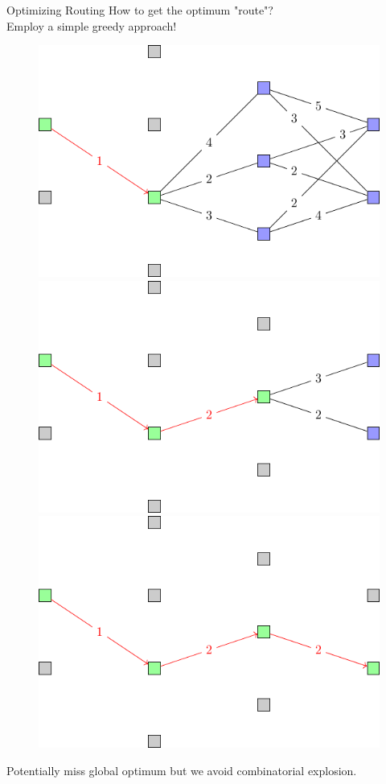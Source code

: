 \documentclass{beamer}
\begin{document}
\begin{frame}{Optimizing Routing}
How to get the optimum "route"? \pause \\
Employ a simple greedy approach! \pause
\begin{figure}
	\begin{overprint}
		\centering
		\includegraphics[scale=0.6]{figures/greedy1}
		\onslide<4>\centering
		\includegraphics[scale=0.6]{figures/greedy2}
		\onslide<5->\centering
		\includegraphics[scale=0.6]{figures/greedy3}
	\end{overprint}
\end{figure}
\pause \pause \pause
Potentially miss global optimum but we avoid combinatorial explosion.
\end{frame}
\end{document}
